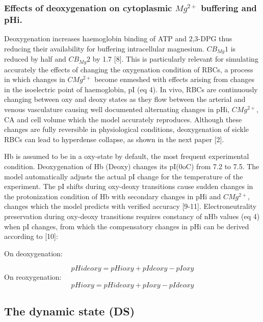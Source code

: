\documentclass[a4paper]{article}
\begin{document}
\subsubsection{Effects of deoxygenation on cytoplasmic $Mg^{2+}$ buffering and pHi.}
Deoxygenation increases haemoglobin binding of ATP and 2,3-DPG thus reducing their availability for buffering intracellular magnesium.  $CB_{Mg}1$ is reduced by half and $CB_{Mg}2$ by 1.7 [8].  This is particularly relevant for simulating accurately the effects of changing the oxygenation condition of RBCs, a process in which changes in $CMg^{2+}$ become enmeshed with effects arising from changes in the isoelectric point of haemoglobin, pI (eq 4).  In vivo, RBCs are continuously changing between oxy and deoxy states as they flow between the arterial and venous vasculature causing well documented alternating changes in pHi, $CMg^{2+}$, CA and cell volume which the model accurately reproduces.  Although these changes are fully reversible in physiological conditions, deoxygenation of sickle RBCs can lead to hyperdense collapse, as shown in the next paper [2]. 

Hb is assumed to be in a oxy-state by default, the most frequent experimental condition. Deoxygenation of Hb (Deoxy) changes its pI(0oC) from 7.2 to 7.5.  The model automatically adjusts the actual pI change for the temperature of the experiment.  The pI shifts during oxy-deoxy transitions cause sudden changes in the protonization condition of Hb with secondary changes in pHi and $CMg^{2+}$, changes which the model predicts with verified accuracy [9-11].  Electroneutrality preservation during oxy-deoxy transitions requires constancy of nHb values (eq 4) when pI changes, from which the compensatory changes in pHi can be derived according to [10]: 

On deoxygenation:

\setcounter{equation}{0}
\renewcommand{\theequation}{4.\alph{equation}}
\begin{equation}
pHideoxy = pHioxy + pIdeoxy - pIoxy 
\end{equation}
On reoxygenation:
\begin{equation}
pHioxy = pHideoxy + pIoxy - pIdeoxy 
\end{equation}

\subsection{The dynamic state (DS)}

\setcounter{equation}{9}
\renewcommand{\theequation}{\arabic{equation}}
\end{document}
